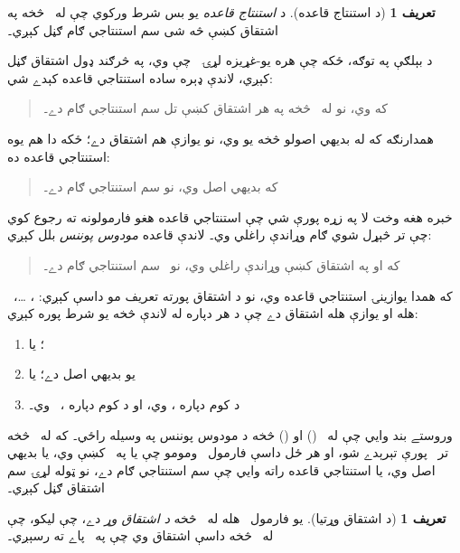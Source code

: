 \documentclass[12pt,a4paper,oneside]{report}
\theoremstyle{definition}
\newtheorem{defn}[thm]{تعريف}
\begin{document}
\label{olpseg:OLP-0113-B009:start}
\begin{defn}[د استنتاج قاعده]
د \emph{استنتاج قاعده} يو بس شرط ورکوي چې له~\LR{$\Gamma$} څخه په
اشتقاق کښې څه شی سم استنتاجي ګام ګڼل کېږي۔
\end{defn}
\label{olpseg:OLP-0113-B009:end}

\label{olpseg:OLP-0113-B010:start}
د بېلګې په توګه، ځکه چې هره يو-غړيزه لړۍ~ چې
 وي، په څرګند ډول اشتقاق ګڼل کېږي، لاندې
ډېره ساده استنتاجي قاعده کېدے شي:
\begin{quote}
  که  وي، نو  له~\LR{$\Gamma$} څخه په هر
  اشتقاق کښې تل سم استنتاجي ګام دے۔
\end{quote}
همدارنګه که  له بديهي اصولو څخه يو وي، نو يوازې  هم
اشتقاق دے؛ ځکه دا هم يوه استنتاجي قاعده ده:
\begin{quote}
  که  بديهي اصل وي، نو  سم استنتاجي ګام دے۔
\end{quote}
خبره هغه وخت لا په زړه پورې شي چې استنتاجي قاعده هغو فارمولونه
ته رجوع کوي چې تر څېړل شوي ګام وړاندې راغلي وي۔ لاندې قاعده
\emph{مودوس پوننس} بلل کېږي:
\begin{quote}
  که  او  په اشتقاق کښې وړاندې راغلي وي،
  نو~ سم استنتاجي ګام دے۔
\end{quote}
که همدا يوازينۍ استنتاجي قاعده وي، نو د اشتقاق پورته تعريف
مو داسې کېږي: ، \dots،~ هله او يوازې هله
اشتقاق دے چې د هر  دپاره له لاندې څخه يو شرط
پوره کېږي:
\begin{enumerate}
\item {}؛ يا
\item {} يو بديهي اصل دے؛ يا
\item د کوم  دپاره ،  وي، او د کوم
   دپاره ،~ وي۔
\end{enumerate}
وروستے بند وايي چې  له~ () او
 () څخه د مودوس پوننس په وسيله راځي۔ که له~ څخه
تر~ پورې تېرېدے شو، او هر ځل داسې فارمول~ ومومو
چې يا په~\LR{$\Gamma$} کښې وي، يا بديهي اصل وي، يا استنتاجي قاعده راته
وايي چې سم استنتاجي ګام دے، نو ټوله لړۍ سم اشتقاق ګڼل کېږي۔
\label{olpseg:OLP-0113-B010:end}

\label{olpseg:OLP-0113-B011:start}
\begin{defn}[د اشتقاق وړتيا]
يو فارمول~ هله له~\LR{$\Gamma$} څخه \emph{د اشتقاق وړ} دے،
چې  ليکو، چې له~\LR{$\Gamma$} څخه داسې
اشتقاق وي چې په~ پاے ته رسېږي۔
\end{defn}
\label{olpseg:OLP-0113-B011:end}
\end{document}
